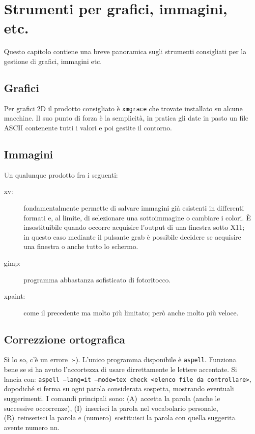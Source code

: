 \chapter{Strumenti per grafici, immagini, etc.}

Questo capitolo contiene una breve panoramica sugli strumenti consigliati per 
la gestione di grafici, immagini etc.

\section{Grafici}

Per  grafici  2D il  prodotto  consigliato  è \texttt{xmgrace}  che  trovate
installato su  alcune macchine. Il suo  punto di forza è  la semplicità, in
pratica gli  date in pasto  un file ASCII contenente  tutti i valori  e poi
gestite il contorno.

\section{Immagini}

Un qualunque prodotto fra i seguenti:
\begin{description}
\item[xv:] fondamentalmente permette di salvare immagini già esistenti in differenti formati e, al limite, di
selezionare una sottoimmagine o cambiare i colori. È insostituibile quando 
occorre acquisire l'output di una finestra sotto X11; in questo caso mediante il pulsante grab è possibile
decidere se acquisire una finestra o anche tutto lo schermo.
\item[gimp:] programma abbastanza sofisticato di fotoritocco.
\item[xpaint:] come il precedente ma molto più limitato; però anche molto più veloce.
\end{description}

\section{Correzzione ortografica}

Sì lo so, c'è un errore~:-).
L'unico programma disponibile è \texttt{aspell}. Funziona bene se si ha avuto l'accortezza di usare dirrettamente le lettere
accentate.
Si lancia con: \texttt{aspell --lang=it --mode=tex check <elenco file da controllare>}, dopodiché si ferma su ogni parola considerata
sospetta, mostrando eventuali suggerimenti. I comandi principali sono:
(A)~accetta la parola (anche le successive occorrenze), (I)~inserisci la parola nel vocabolario personale, (R)~reinserisci la parola e
(numero)~sostituisci la parola con quella suggerita avente numero nn.





